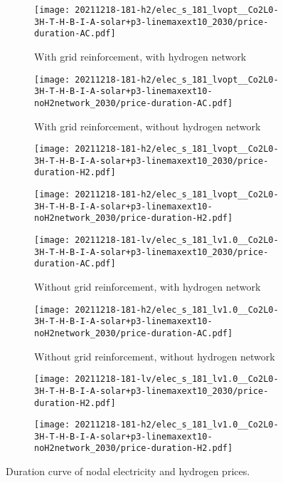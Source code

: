 \begin{figure}
    \begin{subfigure}{0.49\textwidth}
        \centering
        \caption{With grid reinforcement, with hydrogen network}
        \texttt{[image: 20211218-181-h2/elec\_s\_181\_lvopt\_\_Co2L0-3H-T-H-B-I-A-solar+p3-linemaxext10\_2030/price-duration-AC.pdf]}
    \end{subfigure}
    \begin{subfigure}{0.49\textwidth}
        \centering
        \caption{With grid reinforcement, without hydrogen network}
        \texttt{[image: 20211218-181-h2/elec\_s\_181\_lvopt\_\_Co2L0-3H-T-H-B-I-A-solar+p3-linemaxext10-noH2network\_2030/price-duration-AC.pdf]}
    \end{subfigure}
    \begin{subfigure}{0.49\textwidth}
        \centering
        \texttt{[image: 20211218-181-h2/elec\_s\_181\_lvopt\_\_Co2L0-3H-T-H-B-I-A-solar+p3-linemaxext10\_2030/price-duration-H2.pdf]}
    \end{subfigure}
    \begin{subfigure}{0.49\textwidth}
        \centering
        \texttt{[image: 20211218-181-h2/elec\_s\_181\_lvopt\_\_Co2L0-3H-T-H-B-I-A-solar+p3-linemaxext10-noH2network\_2030/price-duration-H2.pdf]}
    \end{subfigure}
    \begin{subfigure}{0.49\textwidth}
        \centering
        \caption{Without grid reinforcement, with hydrogen network}
        \texttt{[image: 20211218-181-lv/elec\_s\_181\_lv1.0\_\_Co2L0-3H-T-H-B-I-A-solar+p3-linemaxext10\_2030/price-duration-AC.pdf]}
    \end{subfigure}
    \begin{subfigure}{0.49\textwidth}
        \centering
        \caption{Without grid reinforcement, without hydrogen network}
        \texttt{[image: 20211218-181-h2/elec\_s\_181\_lv1.0\_\_Co2L0-3H-T-H-B-I-A-solar+p3-linemaxext10-noH2network\_2030/price-duration-AC.pdf]}
    \end{subfigure}
    \begin{subfigure}{0.49\textwidth}
        \centering
        \texttt{[image: 20211218-181-lv/elec\_s\_181\_lv1.0\_\_Co2L0-3H-T-H-B-I-A-solar+p3-linemaxext10\_2030/price-duration-H2.pdf]}
    \end{subfigure}
    \begin{subfigure}{0.49\textwidth}
        \centering
        \texttt{[image: 20211218-181-h2/elec\_s\_181\_lv1.0\_\_Co2L0-3H-T-H-B-I-A-solar+p3-linemaxext10-noH2network\_2030/price-duration-H2.pdf]}
    \end{subfigure}
    \caption{Duration curve of nodal electricity and hydrogen prices.}
    \label{fig:si:lmp-dc}
\end{figure}

